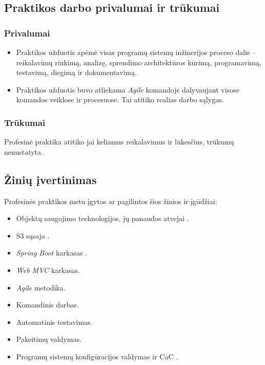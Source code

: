 \subsection{Praktikos darbo privalumai ir trūkumai}

\subsubsection*{Privalumai}
\begin{itemize}
    \item Praktikos užduotis apėmė visas programų sistemų inžinerijos proceso dalis -- reikalavimų rinkimą, analizę, sprendimo architektūros kūrimą, programavimą, testavimą, diegimą ir dokumentavimą.
    \item Praktikos užduotis buvo atliekama \textit{Agile} komandoje dalyvaujant visose komandos veiklose ir procesuose. Tai atitiko realias darbo sąlygas.
\end{itemize}

\subsubsection*{Trūkumai}

Profesinė praktika atitiko jai keliamus reikalavimus ir lūkesčius, trūkumų nenustatyta.

\subsection{Žinių įvertinimas}
Profesinės praktikos metu įgytos ar pagilintos šios žinios ir įgūdžiai:
\begin{itemize}
    \item Objektų saugojimo  technologijos, jų panaudos atvejai .
    \item S3 sąsaja .
    \item \textit{Spring Boot} karkasas .
    \item \textit{Web MVC} karkasas.
    \item \textit{Agile} metodika.
    \item Komandinis darbas.
    \item Automatinis testavimas.
    \item Pakeitimų valdymas.
    \item Programų sistemų konfigūracijos valdymas ir CaC .
\end{itemize}

